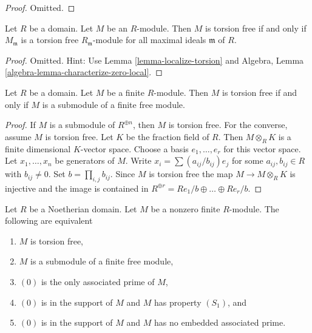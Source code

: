 \begin{proof}
Omitted.
\end{proof}

\begin{lemma}
\label{lemma-check-torsion}
Let $R$ be a domain. Let $M$ be an $R$-module.
Then $M$ is torsion free if and only if $M_\mathfrak m$ is a
torsion free $R_\mathfrak m$-module for all maximal ideals
$\mathfrak m$ of $R$.
\end{lemma}

\begin{proof}
Omitted. Hint: Use Lemma \ref{lemma-localize-torsion} and
Algebra, Lemma \ref{algebra-lemma-characterize-zero-local}.
\end{proof}

\begin{lemma}
\label{lemma-finite-torsion-free-submodule-free}
Let $R$ be a domain. Let $M$ be a finite $R$-module.
Then $M$ is torsion free if and only if $M$ is a
submodule of a finite free module.
\end{lemma}

\begin{proof}
If $M$ is a submodule of $R^{\oplus n}$, then $M$ is torsion free.
For the converse, assume $M$ is torsion free. Let $K$ be the
fraction field of $R$. Then $M \otimes_R K$ is a finite dimensional
$K$-vector space. Choose a basis $e_1, \ldots, e_r$ for this vector
space. Let $x_1, \ldots, x_n$ be generators of $M$. Write
$x_i = \sum (a_{ij}/b_{ij}) e_j$ for some $a_{ij}, b_{ij} \in R$
with $b_{ij} \not = 0$. Set $b = \prod_{i, j} b_{ij}$.
Since $M$ is torsion free the map
$M \to M \otimes_R K$ is injective and the image is contained
in $R^{\oplus r} = R e_1/b \oplus \ldots \oplus Re_r/b$.
\end{proof}

\begin{lemma}
\label{lemma-torsion-free-finite-noetherian-domain}
Let $R$ be a Noetherian domain. Let $M$ be a nonzero finite $R$-module.
The following are equivalent
\begin{enumerate}
\item $M$ is torsion free,
\item $M$ is a submodule of a finite free module,
\item $(0)$ is the only associated prime of $M$,
\item $(0)$ is in the support of $M$ and $M$ has property $(S_1)$, and
\item $(0)$ is in the support of $M$ and $M$ has no embedded associated prime.
\end{enumerate}
\end{lemma}

